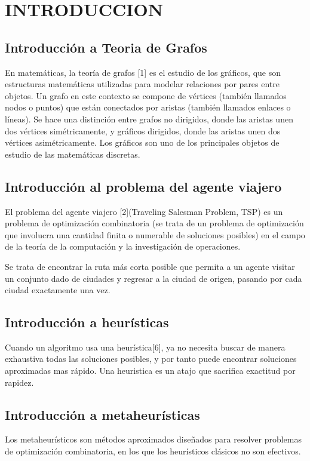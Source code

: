 \documentclass{article}
\begin{document}
\section{INTRODUCCION}
\subsection{Introducción a Teoria de Grafos}
En matemáticas, la teoría de grafos [1] es el estudio de los gráficos, que son estructuras matemáticas utilizadas para modelar relaciones por pares entre objetos. Un grafo en este contexto se compone de vértices (también llamados nodos o puntos) que están conectados por aristas (también llamados enlaces o líneas). Se hace una distinción entre grafos no dirigidos, donde las aristas unen dos vértices simétricamente, y gráficos dirigidos, donde las aristas unen dos vértices asimétricamente. Los gráficos son uno de los principales objetos de estudio de las matemáticas discretas.

\subsection{Introducción al problema del agente viajero}
El problema del agente viajero [2](Traveling Salesman Problem, TSP) es un problema de optimización combinatoria (se trata de un problema de optimización que involucra una cantidad finita o numerable de soluciones posibles) en el campo de la teoría de la computación y la investigación de operaciones. 

Se trata de encontrar la ruta más corta posible que permita a un agente visitar un conjunto dado de ciudades y regresar a la ciudad de origen, pasando por cada ciudad exactamente una vez.

\subsection{Introducción a heurísticas}
Cuando un algoritmo usa una heurística[6], ya no necesita buscar de manera exhaustiva todas las soluciones posibles, y por tanto puede encontrar soluciones aproximadas mas rápido. Una heuristica es un atajo que sacrifica exactitud por rapidez.

\subsection{Introducción a metaheurísticas}
Los metaheurísticos son métodos aproximados diseñados para resolver problemas de optimización combinatoria, en los que los heurísticos clásicos no son efectivos.
\end{document}
